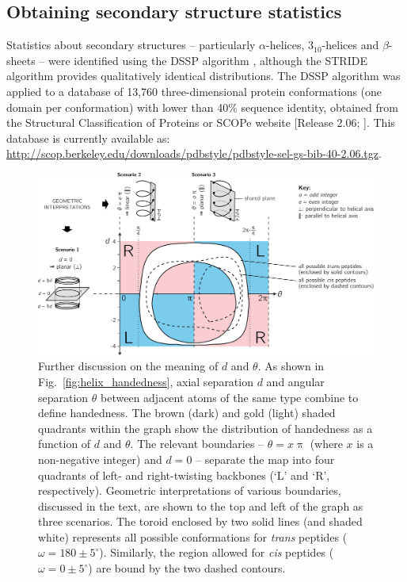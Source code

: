 \documentclass[fleqn,10pt,lineno]{wlpeerj} %
\newcommand{\n}[1]{{\color{black}#1}} %
\newcommand{\Fig}[1]{Fig.~\ref{#1}}
\newcommand{\cis}{{\em{cis}}\xspace}
\newcommand{\trans}{{\em{trans}}\xspace}
\begin{document}
\subsection*{Obtaining secondary structure statistics}
Statistics about secondary structures -- particularly $\alpha$-helices, $3_{10}$-helices and $\beta$-sheets -- %
were identified using the DSSP algorithm \citep{Kabsch1983}, although the STRIDE algorithm \citep{Frishman1995} provides qualitatively identical distributions. \n{The DSSP} algorithm was applied to a database of 13,760 three-dimensional protein conformations (one domain per conformation) with lower than 40\% sequence identity, obtained from the Structural Classification of Proteins or SCOPe website [Release 2.06; \cite{Fox2014}]. This database is currently available as: \url{http://scop.berkeley.edu/downloads/pdbstyle/pdbstyle-sel-gs-bib-40-2.06.tgz}.

\begin{figure}[t!]
\centering
\includegraphics[width=1.0\linewidth]{./figures/dtheta_full3.pdf}
\caption{\label{fig:d_vs_theta} Further discussion on the meaning of $d$ and $\theta$. As shown in \Fig{fig:helix_handedness}, axial separation $d$ and angular separation $\theta$ between adjacent atoms of the same type combine to define handedness. The \n{brown (dark) and gold (light)} shaded \n{quadrants} within the graph show the distribution of handedness as a function of $d$ and $\theta$. The relevant boundaries -- $\theta=x\uppi$ (where $x$ is a non-negative integer) and $d=0$ -- separate the map into four quadrants of left- and right-twisting backbones (`L' and `R', respectively).  Geometric interpretations of various boundaries, discussed in the text, are shown to the top and left of the graph \n{as three scenarios}. The toroid enclosed by two solid lines (and shaded white) represents all possible conformations for \trans peptides ($\omega=180 \pm 5^\circ$). Similarly, the region allowed for \cis peptides ($\omega=0 \pm 5^\circ$) are bound by the two dashed contours. %
}
\end{figure}
\end{document}
